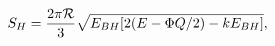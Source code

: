 \begin{equation}
\label{1eq19} S_H=\frac{2\pi {\cal R}}{3}\sqrt{E_{ BH}[2(E-\Phi
Q/2)-kE_{BH}]},
\end{equation}

